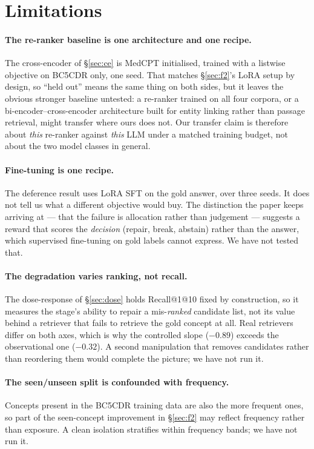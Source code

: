 \documentclass[11pt]{article}
\makeatletter
\newcommand{\rone}{Recall@1}
\makeatother
\begin{document}
\section*{Limitations}

\paragraph{The re-ranker baseline is one architecture and one recipe.} The
cross-encoder of \S\ref{sec:ce} is MedCPT initialised, trained with a listwise objective
on BC5CDR only, one seed. That matches \S\ref{sec:f2}'s LoRA setup by design, so
``held out'' means the same thing on both sides, but it leaves the obvious stronger
baseline untested: a re-ranker trained on all four corpora, or a bi-encoder--cross-encoder
architecture built for entity linking rather than passage retrieval, might transfer
where ours does not. Our transfer claim is therefore about \emph{this} re-ranker
against \emph{this} LLM under a matched training budget, not about the two model
classes in general.

\paragraph{Fine-tuning is one recipe.} The deference result uses LoRA SFT on the gold
answer, over three seeds. It does not tell us what a different objective would buy. The
distinction the paper keeps arriving at --- that the failure is allocation rather than
judgement --- suggests a reward that scores the \emph{decision} (repair, break, abstain)
rather than the answer, which supervised fine-tuning on gold labels cannot express. We
have not tested that.

\paragraph{The degradation varies ranking, not recall.} The dose-response of
\S\ref{sec:dose} holds \rone{}@10 fixed by construction, so it measures the stage's
ability to repair a mis-\emph{ranked} candidate list, not its value behind a
retriever that fails to retrieve the gold concept at all. Real retrievers differ on
both axes, which is why the controlled slope ($-0.89$) exceeds the observational one
($-0.32$). A second manipulation that removes candidates rather than reordering them
would complete the picture; we have not run it.

\paragraph{The seen/unseen split is confounded with frequency.} Concepts present in the
BC5CDR training data are also the more frequent ones, so part of the seen-concept
improvement in \S\ref{sec:f2} may reflect frequency rather than exposure. A clean
isolation stratifies within frequency bands; we have not run it.
\end{document}
